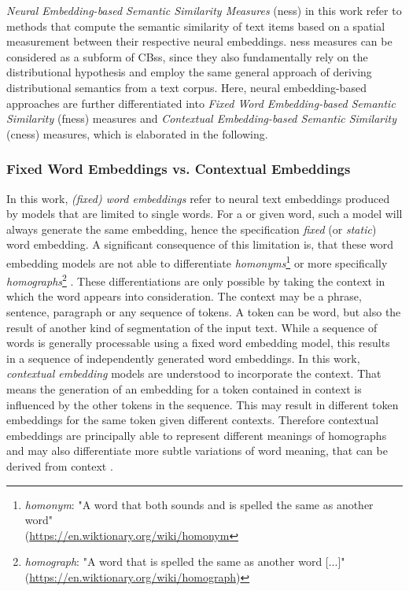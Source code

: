 \documentclass[11pt]{scrreprt}
\let\cite\parencite  %
\begin{document}
\textit{Neural Embedding-based Semantic Similarity Measures} (\gls{ness}) in this work refer to methods that compute the semantic similarity of text items based on a spatial measurement between their respective neural embeddings. \gls{ness} measures can be considered as a subform of CB\gls{ss}, since they also fundamentally rely on the distributional hypothesis and employ the same general approach of deriving distributional semantics from a text corpus. Here, neural embedding-based approaches are further differentiated into \textit{Fixed Word Embedding-based Semantic Similarity} (\gls{fness}) measures and \textit{Contextual Embedding-based Semantic Similarity} (\gls{cness}) measures, which is elaborated in the following. 


\subsubsection{Fixed Word Embeddings vs. Contextual Embeddings}
\label{sec:fixed-word-vs-contextual-embeddings}
In this work, \textit{(fixed) word embeddings} refer to neural text embeddings produced by models  that are limited to single words. For a or given word, such a model will always generate the same embedding, hence the specification \textit{fixed} (or \textit{static}) word embedding. A significant consequence of this limitation is, that these word embedding models are not able to differentiate \textit{homonyms}\footnote{\textit{homonym}: "A word that both sounds and is spelled the same as another word"\\(\url{https://en.wiktionary.org/wiki/homonym}} or more specifically \textit{homographs}\footnote{\textit{homograph}: "A word that is spelled the same as another word [...]"\\(\url{https://en.wiktionary.org/wiki/homograph})} \cite{liWordEmbeddingUnderstanding2018}. These differentiations are only possible by taking the context in which the word appears into consideration. The context may be a phrase, sentence, paragraph or any sequence of tokens. A token can be word, but also the result of another kind of segmentation of the input text. While a sequence of words is generally processable using a fixed word embedding model, this results in a sequence of independently generated word embeddings. In this work, \textit{contextual embedding} models are understood to incorporate the context. That means the generation of an embedding for a token contained in context is influenced by the other tokens in the sequence. This may result in different token embeddings for the same token given different contexts. Therefore contextual embeddings are principally able to represent different meanings of homographs and may also differentiate more subtle variations of word meaning, that can be derived from context \cite{liuSurveyContextualEmbeddings2020}.
\end{document}
